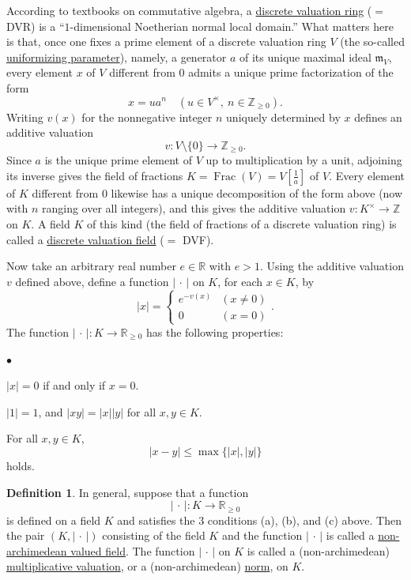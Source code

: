 \documentclass[a4paper,12pt, dvipdfmx]{jsbook}
\def\Z{\mathbb{Z}}
\def\R{\mathbb{R}}
\def\m{\mathfrak{m}}
\def\Frac{\mathop{\mathrm{Frac}}\nolimits}
\newcommand{\abs}[1]{\lvert#1\rvert}
\renewenvironment{itemize}%
{%
   \begin{list}{\parbox{1zw}{$\bullet$}}%
   {%
      \setlength{\topsep}{.5zh}
      \setlength{\itemindent}{0zw}
      \setlength{\leftmargin}{3zw}%
      \setlength{\rightmargin}{0zw}%
      \setlength{\labelsep}{.5zw}%
      \setlength{\labelwidth}{3zw}%
      \setlength{\itemsep}{0.2em}%
      \setlength{\parsep}{0em}%
      \setlength{\listparindent}{0zw}%
   }
}{%
   \end{list}%
}
\theoremstyle{plain}
\theoremstyle{definition}
\newtheorem{dfn}[thm]{\bfseries Definition}
\begin{document}
According to textbooks on commutative algebra, a \underline{discrete valuation ring} ($=$ DVR) is a ``$1$-dimensional Noetherian normal local domain.'' What matters here is that, once one fixes a prime element of a discrete valuation ring $V$ (the so-called \underline{uniformizing parameter}), namely, a generator $a$ of its unique maximal ideal $\m_V$, every element $x$ of $V$ different from $0$ admits a unique prime factorization of the form
$$
x=ua^n\quad(u\in V^{\times},\ n\in\Z_{\geq 0}).
$$
Writing $v(x)$ for the nonnegative integer $n$ uniquely determined by $x$ defines an additive valuation
$$
v\colon V\setminus\{0\}\longrightarrow\Z_{\geq 0}.
$$
Since $a$ is the unique prime element of $V$ up to multiplication by a unit, adjoining its inverse gives the field of fractions $K=\Frac(V)=V[\frac{1}{a}]$ of $V$. Every element of $K$ different from $0$ likewise has a unique decomposition of the form above (now with $n$ ranging over all integers), and this gives the additive valuation $v\colon K^{\times}\rightarrow\Z$ on $K$.
A field $K$ of this kind (the field of fractions of a discrete valuation ring) is called a \underline{discrete valuation field} ($=$ DVF).

Now take an arbitrary real number $e\in\R$ with $e>1$. Using the additive valuation $v$ defined above, define a function $\abs{\,\cdot\,}$ on $K$, for each $x\in K$, by
$$
\abs{x}=\left\{\begin{array}{cl}e^{-v(x)}&(x\neq 0)\\ 0&(x=0)\end{array}\right..
$$
The function $\abs{\,\cdot\,}\colon K\rightarrow\R_{\geq 0}$ has the following properties:
\begin{itemize}
\item[(a)] $\abs{x}=0$ if and only if $x=0$.
\item[(b)] $\abs{1}=1$, and $\abs{xy}=\abs{x}\abs{y}$ for all $x,y\in K$.
\item[(c)] For all $x,y\in K$,
\begin{equation}\label{eqn-nonarchimedeanvalue}
\abs{x-y}\leq\max\{\abs{x},\abs{y}\}
\end{equation}
holds.
\end{itemize}

\begin{dfn}\label{dfn-nonarchimedeanvaluedfields}{\rm 
In general, suppose that a function
$$
\abs{\,\cdot\,}\colon K\longrightarrow\R_{\geq 0}
$$
is defined on a field $K$ and satisfies the $3$ conditions (a), (b), and (c) above. Then the pair $(K,\abs{\,\cdot\,})$ consisting of the field $K$ and the function $\abs{\,\cdot\,}$ is called a \underline{non-archimedean valued field}.
The function $\abs{\,\cdot\,}$ on $K$ is called a (non-archimedean) \underline{multiplicative valuation}, or a (non-archimedean) \underline{norm}, on $K$.}
\end{dfn}
\end{document}
